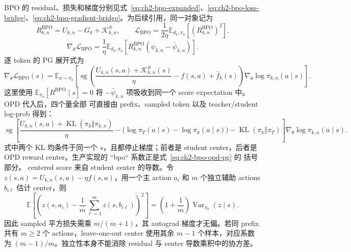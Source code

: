 BPO 的 residual、损失和梯度分别见式~\eqref{eq:ch2-bpo-expanded}、\eqref{eq:ch2-bpo-loss-bridge}、\eqref{eq:ch2-bpo-gradient-bridge}。为后续引用，同一对象记为
\begin{equation}
R_{k,n}^{\mathrm{BPO}}=U_{k,n}-G_k+\mathcal K_{k,n}^{S},\qquad
\mathcal L_{\mathrm{BPO}}=\frac1{2\eta}\mathbb E_{d_k,\pi_k}[(R_{k,n}^{\mathrm{BPO}})^2].
\label{eq:ch2-bpo-residual}
\end{equation}
\begin{equation}
\nabla_\theta\mathcal L_{\mathrm{BPO}}
=\frac1\eta\mathbb E_{d_k,\pi_k}[R_{k,n}^{\mathrm{BPO}}(\psi_{k,n}-\bar\psi_{k,n})].
\label{eq:ch2-bpo-gradient}
\end{equation}
逐 token 的 PG 展开式为
\begin{equation}
\label{eq:ch2-bpo-pg}
\nabla_\theta\mathcal L_{\mathrm{BPO}}(s)
=\mathbb E_{a\sim\pi_k}\left[
\operatorname{sg}\!\left(\frac{U_{k,n}(s,a)+\mathcal K_{k,n}^{S}(s)}\eta-f(s,a)+\bar f_k(s)\right)
\nabla_\theta\log\pi_{k,n}(a\mid s)\right].
\end{equation}
这里使用 $\mathbb E_{\pi_k}[R^{\mathrm{BPO}}\mid s]=0$ 将
$-\bar\psi_{k,n}$ 项吸收到同一个 score expectation 中。OPD 代入后，四个量全部
可直接由 prefix、sampled token 以及 teacher/student log-prob 得到：
\begin{equation}
\label{eq:ch2-bpo-opd-pg}
\operatorname{sg}\!\left[
\frac{U_{k,n}(s,a)+\operatorname{KL}(\pi_k\Vert\pi_{k,n})}{\eta}
-\bigl(\log\pi_T(a\mid s)-\log\pi_k(a\mid s)\bigr)
-\operatorname{KL}(\pi_k\Vert\pi_T)
\right]\nabla_\theta\log\pi_{k,n}(a\mid s).
\end{equation}
式中两个 KL 均条件于同一个 $s$，且都停止梯度；前者是 student center，后者是
OPD reward center。生产实现的 ``bpo`` 系数正是式~\eqref{eq:ch2-bpo-opd-pg} 的
括号部分。
centered score 来自 student center 的导数。令 $z(s,a)=U_{k,n}(s,a)-\eta f(s,a)$，用一个主 action $a_i$ 和 $m$ 个独立辅助 actions $b_{i\ell}$ 估计 center，则
\[
\mathbb E\left[\left(z(s,a_i)-\frac1m\sum_{\ell=1}^m z(s,b_{i\ell})\right)^2\right]
=\left(1+\frac1m\right)\operatorname{Var}_{\pi_k}(z\mid s).
\]
因此 sampled 平方损失需乘 $m/(m+1)$，其 autograd 梯度才无偏。若同 prefix 共有 $m\ge2$ 个 actions，leave-one-out center 使用其余 $m-1$ 个样本，对应系数为 $(m-1)/m$。独立性本身不能消除 residual 与 center 导数乘积中的协方差。

